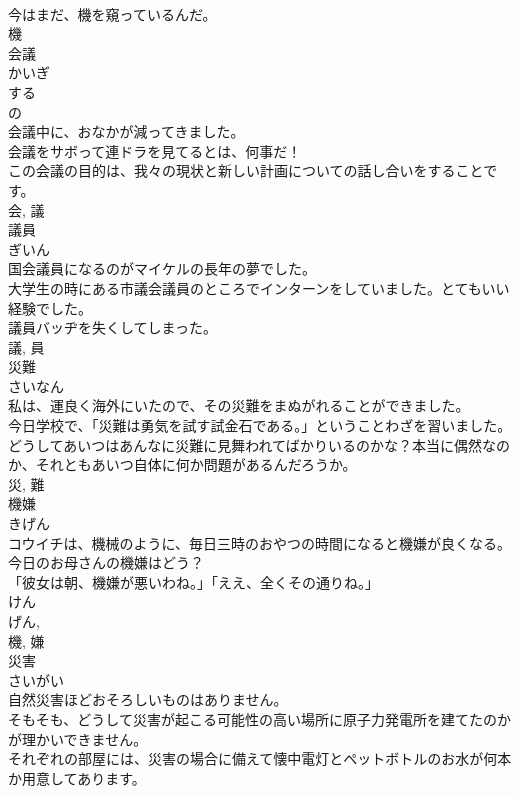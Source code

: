 \documentclass[8pt]{extreport}
\begin{document}
\begin{CJK}{UTF8}{min}
\\	今はまだ、機を窺っているんだ。	
\\	機	
\\	会議	
\\	かいぎ	
\\	する 
\\	の 
\\	会議中に、おなかが減ってきました。	
\\	会議をサボって連ドラを見てるとは、何事だ！	
\\	この会議の目的は、我々の現状と新しい計画についての話し合いをすることです。	
\\	会, 議	
\\	議員	
\\	ぎいん	
\\	国会議員になるのがマイケルの長年の夢でした。	
\\	大学生の時にある市議会議員のところでインターンをしていました。とてもいい経験でした。	
\\	議員バッヂを失くしてしまった。	
\\	議, 員	
\\	災難	
\\	さいなん	
\\	私は、運良く海外にいたので、その災難をまぬがれることができました。	
\\	今日学校で、「災難は勇気を試す試金石である。」ということわざを習いました。	
\\	どうしてあいつはあんなに災難に見舞われてばかりいるのかな？本当に偶然なのか、それともあいつ自体に何か問題があるんだろうか。	
\\	災, 難	
\\	機嫌	
\\	きげん	
\\	コウイチは、機械のように、毎日三時のおやつの時間になると機嫌が良くなる。	
\\	今日のお母さんの機嫌はどう？	
\\	「彼女は朝、機嫌が悪いわね。」「ええ、全くその通りね。」	
\\	けん 
\\	げん, 
\\	機, 嫌	
\\	災害	
\\	さいがい	
\\	自然災害ほどおそろしいものはありません。	
\\	そもそも、どうして災害が起こる可能性の高い場所に原子力発電所を建てたのかが理かいできません。	
\\	それぞれの部屋には、災害の場合に備えて懐中電灯とペットボトルのお水が何本か用意してあります。	

\end{CJK}
\end{document}
